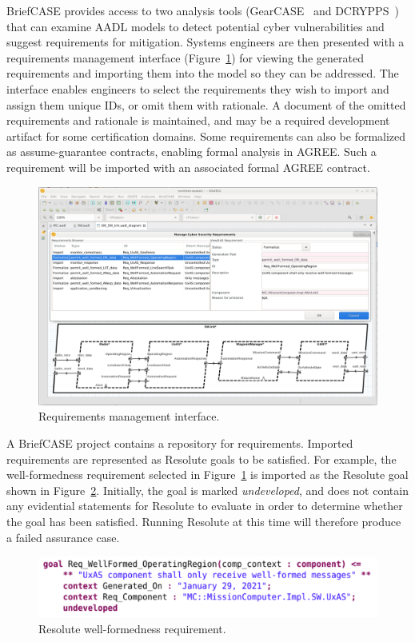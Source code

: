 BriefCASE provides access to two analysis tools (GearCASE~\cite{gearcase2020} and DCRYPPS~\cite{dcrypps2019}) that can examine AADL models to detect potential cyber vulnerabilities and suggest requirements for mitigation.
%
Systems engineers are then presented with a requirements management interface (Figure~\ref{fig:req-mgmt}) for viewing the generated requirements and importing them into the model so they can be addressed.  The interface enables engineers to select the requirements they wish to import and assign them unique IDs, or omit them with rationale.  A document of the omitted requirements and rationale is maintained, and may be a required development artifact for some certification domains.  Some requirements can also be formalized as assume-guarantee contracts, enabling formal analysis in AGREE.  Such a requirement will be imported with an associated formal AGREE contract.

\begin{figure}[h]
	\centering
	\includegraphics[width=\columnwidth]{figs/req-mgmt.png}
	\caption{Requirements management interface.} 
	\label{fig:req-mgmt} 
\end{figure}

A BriefCASE project contains a repository for requirements.  Imported requirements are represented as Resolute goals to be satisfied.  For example, the well-formedness requirement selected in Figure~\ref{fig:req-mgmt} is imported as the Resolute goal shown in Figure~\ref{fig:req-wellformed-or}.
Initially, the goal is marked \textit{undeveloped}, and does not contain any evidential statements for Resolute to evaluate in order to determine whether the goal has been satisfied.  Running Resolute at this time will therefore produce a failed assurance case. 

\begin{figure}[h]
	\centering
	\includegraphics[width=1\columnwidth]{figs/req-wellformed-or.png}
	\caption{Resolute well-formedness requirement.} 
	\label{fig:req-wellformed-or} 
\end{figure}